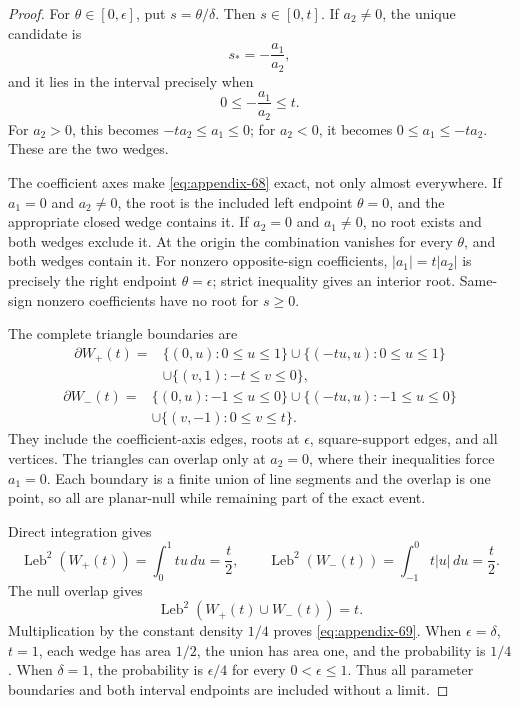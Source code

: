 \begin{proof}
For $\theta\in[0,\epsilon]$, put $s=\theta/\delta$.  Then
$s\in[0,t]$.  If $a_2\neq0$, the unique candidate is
\[
s_*=-\frac{a_1}{a_2},
\]
and it lies in the interval precisely when
\begin{equation}
0\leq-\frac{a_1}{a_2}\leq t.
\label{eq:appendix-70}
\end{equation}
For $a_2>0$, this becomes $-ta_2\leq a_1\leq0$; for $a_2<0$, it becomes
$0\leq a_1\leq-ta_2$.  These are the two wedges.

The coefficient axes make \eqref{eq:appendix-68} exact, not only almost everywhere.  If
$a_1=0$ and $a_2\neq0$, the root is the included left endpoint
$\theta=0$, and the appropriate closed wedge contains it.  If $a_2=0$ and
$a_1\neq0$, no root exists and both wedges exclude it.  At the origin the
combination vanishes for every $\theta$, and both wedges contain it.  For
nonzero opposite-sign coefficients, $|a_1|=t|a_2|$ is precisely the right
endpoint $\theta=\epsilon$; strict inequality gives an interior root.
Same-sign nonzero coefficients have no root for $s\geq0$.

The complete triangle boundaries are
\begin{equation}
\begin{aligned}
\partial W_+(t)
={}&\{(0,u):0\leq u\leq1\}
\cup\{(-tu,u):0\leq u\leq1\}\\
&\cup\{(v,1):-t\leq v\leq0\},
\end{aligned}
\label{eq:appendix-71}
\end{equation}
\begin{equation}
\begin{aligned}
\partial W_-(t)
={}&\{(0,u):-1\leq u\leq0\}
\cup\{(-tu,u):-1\leq u\leq0\}\\
&\cup\{(v,-1):0\leq v\leq t\}.
\end{aligned}
\label{eq:appendix-72}
\end{equation}
They include the coefficient-axis edges, roots at $\epsilon$, square-support
edges, and all vertices.  The triangles can overlap only at $a_2=0$, where
their inequalities force $a_1=0$.  Each boundary is a finite union of line
segments and the overlap is one point, so all are planar-null while remaining
part of the exact event.

Direct integration gives
\[
\operatorname{Leb}^2(W_+(t))=\int_0^1tu\,du=\frac t2,
\qquad
\operatorname{Leb}^2(W_-(t))=\int_{-1}^0t|u|\,du=\frac t2.
\]
The null overlap gives
\begin{equation}
\operatorname{Leb}^2(W_+(t)\cup W_-(t))=t.
\label{eq:appendix-73}
\end{equation}
Multiplication by the constant density $1/4$ proves \eqref{eq:appendix-69}.
When $\epsilon=\delta$, $t=1$, each wedge has area $1/2$, the union has
area one, and the probability is $1/4$.  When $\delta=1$, the probability
is $\epsilon/4$ for every $0<\epsilon\leq1$.  Thus all parameter boundaries
and both interval endpoints are included without a limit.
\end{proof}

